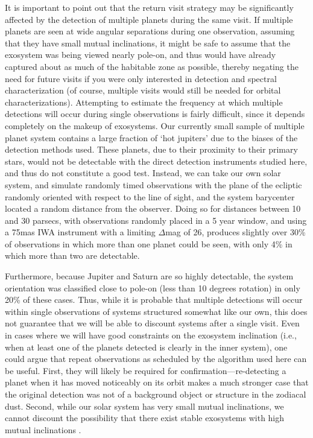 It is important to point out that the return visit strategy may be significantly affected by the detection of multiple planets during the same visit.  If multiple planets are seen at wide angular separations during one observation, assuming that they have small mutual inclinations, it might be safe to assume that the exosystem was being viewed nearly pole-on, and thus would have already captured about as much of the habitable zone as possible, thereby negating the need for future visits if you were only interested in detection and spectral characterization (of course, multiple visits would still be needed for orbital characterizations).  Attempting to estimate the frequency at which multiple detections will occur during single observations is fairly difficult, since it depends completely on the makeup of exosystems.  Our currently small sample of multiple planet system contains a large fraction of `hot jupiters' due to the biases of the detection methods used.  These planets, due to their proximity to their primary stars, would not be detectable with the direct detection instruments studied here, and thus do not constitute a good test.  Instead, we can take our own solar system, and simulate randomly timed observations with the plane of the ecliptic randomly oriented with respect to the line of sight, and the system barycenter located a random distance from the observer.   Doing so for distances between 10 and 30 parsecs, with observations randomly placed in a 5 year window, and using a 75mas IWA instrument with a limiting $\Delta$mag of 26, produces slightly over 30\% of observations in which more than one planet could be seen, with only 4\% in which more than two are detectable.  

Furthermore, because Jupiter and Saturn are so highly detectable, the system orientation was classified close to pole-on (less than 10 degrees rotation) in only 20\% of these cases.  Thus, while it is probable that multiple detections will occur within single observations of systems structured somewhat like our own, this does not guarantee that we will be able to discount systems after a  single visit.  Even in cases where we will have good constraints on the exosystem inclination (i.e., when at least one of the planets detected is clearly in the inner system), one could argue that repeat observations as scheduled by the algorithm used here can be useful.  First, they will likely be required for confirmation---re-detecting a planet when it has moved noticeably on its orbit makes a much stronger case that the original detection was not of a background object or structure in the zodiacal dust. Second, while our solar system has very small mutual inclinations, we cannot discount the possibility that there exist stable exosystems with high mutual inclinations \citep{libert2007exoplanetary}.  

